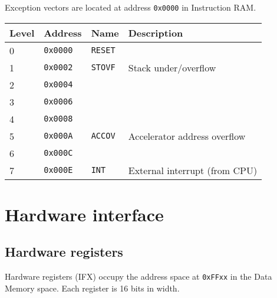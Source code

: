 \documentclass[oneside,english,a4paper,10pt,oneside,openany,final]{memoir}
\newcommand{\Address}[1]{\texttt{#1}}
\begin{document}
Exception vectors are located at address \Address{0x0000} in Instruction RAM.

\begin{table}[htb]
\centering
\begin{tabular}{|l|l|l|l|}
\hline
\textbf{Level} & \textbf{Address} & \textbf{Name}  & \textbf{Description}          \\ \hline
0              & \Address{0x0000} & \texttt{RESET} &                               \\ \hline
1              & \Address{0x0002} & \texttt{STOVF} & Stack under/overflow          \\ \hline
2              & \Address{0x0004} &                &                               \\ \hline
3              & \Address{0x0006} &                &                               \\ \hline
4              & \Address{0x0008} &                &                               \\ \hline
5              & \Address{0x000A} & \texttt{ACCOV} & Accelerator address overflow  \\ \hline
6              & \Address{0x000C} &                &                               \\ \hline
7              & \Address{0x000E} & \texttt{INT}   & External interrupt (from CPU) \\ \hline
\end{tabular}
\end{table}

\pagebreak{}

\chapter{Hardware interface}

\section{Hardware registers}

Hardware registers (IFX) occupy the address space at \Address{0xFFxx} in the Data Memory space. Each register is 16 bits in width.
\end{document}
